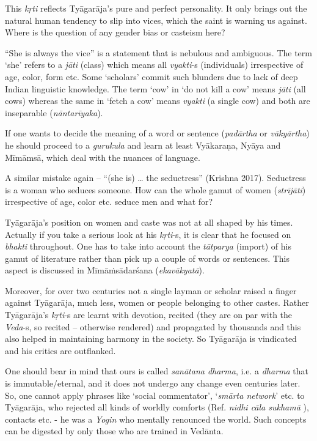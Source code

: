 \begin{enumerate}
 This \textit{kṛti} reflects Tyāgarāja’s pure and perfect personality. It only brings out the natural human tendency to slip into vices, which the saint is warning us against. Where is the question of any gender bias or casteism here?

\end{enumerate}

“She is always the vice” is a statement that is nebulous and ambiguous. The term ‘she’ refers to a \textit{jāti} (class) which means all \textit{vyakti}-s (individuals) irrespective of age, color, form etc. Some ‘scholars’ commit such blunders due to lack of deep Indian linguistic knowledge. The term ‘cow’ in ‘do not kill a cow’ means \textit{jāti} (all cows) whereas the same in ‘fetch a cow’ means \textit{vyakti} (a single cow) and both are inseparable (\textit{nāntarīyaka}). 

If one wants to decide the meaning of a word or sentence (\textit{padārtha} or \textit{vākyārtha}) he should proceed to a \textit{gurukula} and learn at least Vyākaraṇa, Nyāya and Mīmāmsā, which deal with the nuances of language. 

A similar mistake again – “(she is) … the seductress” (Krishna 2017). Seductress is a woman who seduces someone. How can the whole gamut of women (\textit{strījāti}) irrespective of age, color etc. seduce men and what for? 

Tyāgarāja’s position on women and caste was not at all shaped by his times. Actually if you take a serious look at his \textit{kṛti}-s, it is clear that he focused on \textit{bhakti} throughout. One has to take into account the \textit{tātparya} (import) of his gamut of literature rather than pick up a couple of words or sentences. This aspect is discussed in Mīmāṁsādarśana (\textit{ekavākyatā}). 

Moreover, for over two centuries not a single layman or scholar raised a finger against Tyāgarāja, much less, women or people belonging to other castes. Rather Tyāgarāja’s \textit{kṛti}-s are learnt with devotion, recited (they are on par with the \textit{Veda}-s, so recited – otherwise rendered) and propagated by thousands and this also helped in maintaining harmony in the society. So Tyāgarāja is vindicated and his critics are outflanked. 

One should bear in mind that ours is called \textit{sanātana dharma}, i.e. a \textit{dharma} that is immutable/eternal, and it does not undergo any change even centuries later. So, one cannot apply phrases like ‘social commentator’, ‘\textit{smārta network}’ etc. to Tyāgarāja, who rejected all kinds of worldly comforts (Ref. \textit{nidhi cāla sukhamā} ), contacts etc. - he was a \textit{Yogin} who mentally renounced the world. Such concepts can be digested by only those who are trained in Vedānta.

